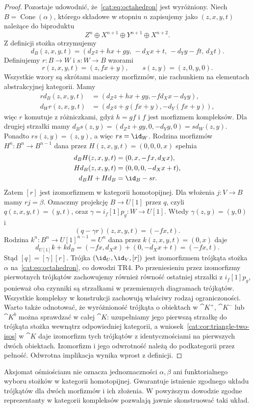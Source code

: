 \begin{proof}
Pozostaje udowodnić, że~\eqref{cat:eq:octahedron} jest wyróżniony. Niech $B=\operatorname{Cone}(\alpha)$, którego składowe w stopniu $n$ zapisujemy jako $(z,x,y,t)$ należące do biproduktu
\[
 Z^n\oplus X^{n+1}\oplus Y^{n+1}\oplus X^{n+2}.
\]
Z definicji stożka otrzymujemy
\[
 d_B(z,x,y,t)=(d_Zz+hx+gy,\,-d_Xx+t,\,-d_Yy-ft,\,d_Xt).
\]
Definiujemy $r:B\to W$ i $s:W\to B$ wzorami
\[
 r(z,x,y,t)=(z,fx+y),\qquad s(z,y)=(z,0,y,0).
\]
Wszystkie wzory są skrótami macierzy morfizmów, nie rachunkiem na elementach abstrakcyjnej kategorii. Mamy
\[
\begin{aligned}
 rd_B(z,x,y,t)&=(d_Zz+hx+gy,-fd_Xx-d_Yy),\\
 d_Wr(z,x,y,t)&=(d_Zz+g(fx+y),-d_Y(fx+y)),
\end{aligned}
\]
więc $r$ komutuje z różniczkami, gdyż $h=gf$ i $f$ jest morfizmem kompleksów. Dla drugiej strzałki mamy $d_Bs(z,y)=(d_Zz+gy,0,-d_Yy,0)=sd_W(z,y)$. Ponadto $rs(z,y)=(z,y)$, a więc $rs=\id_W$. Rodzina morfizmów $H^n:B^n\to B^{n-1}$ dana przez $H(z,x,y,t)=(0,0,0,x)$ spełnia
\[
\begin{aligned}
 d_BH(z,x,y,t)&=(0,x,-fx,d_Xx),\\
 Hd_B(z,x,y,t)&=(0,0,0,-d_Xx+t),\\
 d_BH+Hd_B&=\id_B-sr.
\end{aligned}
\]
Zatem $[r]$ jest izomorfizmem w kategorii homotopijnej. Dla włożenia $j:V\to B$ mamy $rj=\beta$. Oznaczmy projekcję $B\to U[1]$ przez $q$, czyli $q(z,x,y,t)=(y,t)$, oraz $\gamma=i_f[1]p_g:W\to U[1]$. Wtedy $\gamma(z,y)=(y,0)$ i
\[
 (q-\gamma r)(z,x,y,t)=(-fx,t).
\]
Rodzina $k^n:B^n\to U[1]^{n-1}=U^n$ dana przez $k(z,x,y,t)=(0,x)$ daje
\[
 d_{U[1]}k+kd_B=(-fx,d_Xx)+(0,-d_Xx+t)=(-fx,t).
\]
Stąd $[q]=[\gamma][r]$. Trójka $(\id_U,\id_V,[r])$ jest izomorfizmem trójkąta stożka $\alpha$ na~\eqref{cat:eq:octahedron}, co dowodzi TR4. Po przeniesieniu przez izomorfizmy pierwotnych trójkątów zachowujemy również równość ostatniej strzałki z $i_f[1]p_g$, ponieważ oba czynniki są strzałkami w przemiennych diagramach trójkątów. Wszystkie kompleksy w konstrukcji zachowują właściwy rodzaj ograniczoności. Warto także odnotować, że wyróżnioność trójkąta o obiektach w $\cat K^+$, $\cat K^-$ lub $\cat K^b$ można sprawdzać w całej $\cat K$: uzupełniamy jego pierwszą strzałkę do trójkąta stożka wewnątrz odpowiedniej kategorii, a wniosek~\ref{cat:cor:triangle-two-isos} w $\cat K$ daje izomorfizm tych trójkątów z identycznościami na pierwszych dwóch obiektach. Izomorfizm i jego odwrotność należą do podkategorii przez pełność. Odwrotna implikacja wynika wprost z definicji.
\end{proof}
\begin{uwaga}
Aksjomat ośmiościanu nie oznacza jednoznaczności $\alpha,\beta$ ani funktorialnego wyboru stożków w kategorii homotopijnej. Gwarantuje istnienie zgodnego układu trójkątów dla dwóch morfizmów i ich złożenia. W powyższym dowodzie zgodne reprezentanty w kategorii kompleksów pozwalają jawnie skonstruować taki układ.
\end{uwaga}

